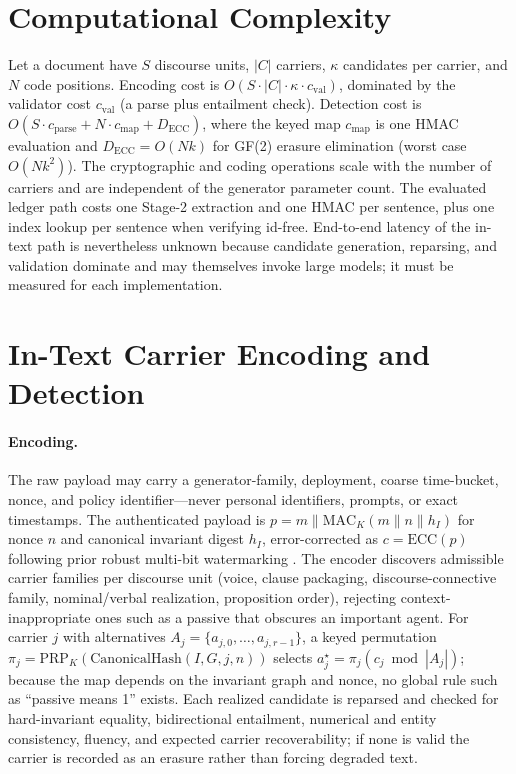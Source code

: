 \documentclass[journal]{IEEEtran}
\begin{document}
\section{Computational Complexity}
\label{app:complexity}
Let a document have $S$ discourse units, $|C|$ carriers, $\kappa$ candidates per carrier, and $N$ code positions. Encoding cost is $O(S\cdot|C|\cdot\kappa\cdot c_{\mathrm{val}})$, dominated by the validator cost $c_{\mathrm{val}}$ (a parse plus entailment check). Detection cost is $O(S\cdot c_{\mathrm{parse}} + N\cdot c_{\mathrm{map}} + D_{\mathrm{ECC}})$, where the keyed map $c_{\mathrm{map}}$ is one HMAC evaluation and $D_{\mathrm{ECC}}=O(N k)$ for GF(2) erasure elimination (worst case $O(Nk^2)$). The cryptographic and coding operations scale with the number of carriers and are independent of the generator parameter count. The evaluated ledger path costs one Stage-2 extraction and one HMAC per sentence, plus one index lookup per sentence when verifying id-free. End-to-end latency of the in-text path is nevertheless unknown because candidate generation, reparsing, and validation dominate and may themselves invoke large models; it must be measured for each implementation.

\section{In-Text Carrier Encoding and Detection}
\label{app:carrier}
\paragraph{Encoding.} The raw payload may carry a generator-family, deployment, coarse time-bucket, nonce, and policy identifier---never personal identifiers, prompts, or exact timestamps. The authenticated payload is $p=m\parallel\mathrm{MAC}_K(m\parallel n\parallel h_I)$ for nonce $n$ and canonical invariant digest $h_I$, error-corrected as $c=\mathrm{ECC}(p)$ following prior robust multi-bit watermarking \cite{qu2024multibitecc}. The encoder discovers admissible carrier families per discourse unit (voice, clause packaging, discourse-connective family, nominal/verbal realization, proposition order), rejecting context-inappropriate ones such as a passive that obscures an important agent. For carrier $j$ with alternatives $A_j=\{a_{j,0},\ldots,a_{j,r-1}\}$, a keyed permutation $\pi_j=\mathrm{PRP}_K(\mathrm{CanonicalHash}(I,G,j,n))$ selects $a_j^\star=\pi_j(c_j\bmod|A_j|)$; because the map depends on the invariant graph and nonce, no global rule such as ``passive means 1'' exists. Each realized candidate is reparsed and checked for hard-invariant equality, bidirectional entailment, numerical and entity consistency, fluency, and expected carrier recoverability; if none is valid the carrier is recorded as an erasure rather than forcing degraded text.
\end{document}

